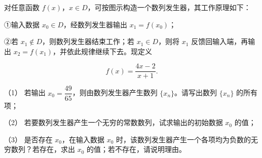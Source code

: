 \begin{question}
对任意函数 $f(x)$，$x\in D$，可按图示构造一个数列发生器，其工作原理如下：

①输入数据 $x_0\in D$，经数列发生器输出 $x_1=f(x_0)$；

②若 $x_1\notin D$，则数列发生器结束工作；若 $x_1\in D$，则将 $x_1$ 反馈回输入端，再输出 $x_2=f(x_1)$，并依此规律继续下去。现定义

\nopagebreak[4]
\[
f(x)=\frac{4x-2}{x+1}.
\]
\nopagebreak[4]
\begin{center}\end{center}
\nopagebreak[4]
（1） 若输出 $x_0=\dfrac{49}{65}$，则由数列发生器产生数列 $\{x_n\}$。请写出数列 $\{x_n\}$ 的所有项；

（2） 若要数列发生器产生一个无穷的常数数列，试求输出的初始数据 $x_0$ 的值；

（3） 是否存在 $x_0$，在输入数据 $x_0$ 时，该数列发生器产生一个各项均为负数的无穷数列？若存在，求出 $x_0$ 的值；若不存在，请说明理由。

\end{question}